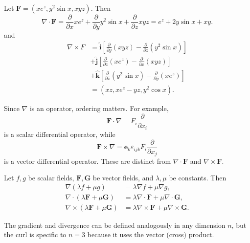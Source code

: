 \documentclass[a4paper]{article}
\begin{document}
\begin{eg}
  Let $\mathbf{F} = (xe^z, y^2\sin x, xyz)$. Then
  \[
    \nabla \cdot \mathbf{F} = \frac{\partial }{\partial x}xe^z + \frac{\partial}{\partial y}y^2 \sin x + \frac{\partial}{\partial z}xyz = e^z + 2y\sin x + xy.
  \]
  and
  \begin{align*}
    \nabla \times F &= \hat{\mathbf{i}} \left[\frac{\partial}{\partial y}(xyz) - \frac{\partial}{\partial z}(y^2\sin x)\right]\\
    &+ \hat{\mathbf{j}} \left[\frac{\partial}{\partial z}(xe^z) - \frac{\partial}{\partial x}(xyz)\right]\\
    &+ \hat{\mathbf{k}}\left[\frac{\partial}{\partial x}(y^2\sin x) - \frac{\partial}{\partial y} (xe^z)\right]\\
    &= (xz, xe^z - yz, y^2\cos x).
  \end{align*}
\end{eg}
\begin{rmk}
  Since $\nabla$ is an operator, ordering matters. For example,
  \[
    \mathbf{F}\cdot \nabla = F_i\frac{\partial }{\partial x_i}
  \]
  is a scalar differential operator, while
  \[
    \mathbf{F}\times \nabla = \mathbf{e}_k\varepsilon_{ijk}F_i\frac{\partial}{\partial x_j}
  \]
  is a vector differential operator. These are distinct from $\nabla \cdot \mathbf{F}$ and $\nabla \times \mathbf{F}$.
\end{rmk}

\begin{prop}
  Let $f, g$ be scalar fields, $\mathbf{F}, \mathbf{G}$ be vector fields, and $\lambda, \mu$ be constants. Then
  \begin{align*}
    \nabla(\lambda f + \mu g) &= \lambda\nabla f + \mu\nabla g,\\
    \nabla\cdot (\lambda \mathbf{F} + \mu \mathbf{G}) &= \lambda\nabla \cdot \mathbf{F} + \mu\nabla\cdot \mathbf{G},\\
    \nabla\times (\lambda \mathbf{F} + \mu \mathbf{G}) &= \lambda\nabla\times \mathbf{F} + \mu\nabla\times \mathbf{G}.
  \end{align*}
\end{prop}

\begin{rmk}
  The gradient and divergence can be defined analogously in any dimension $n$, but the curl is specific to $n = 3$ because it uses the vector (cross) product.
\end{rmk}
\end{document}
